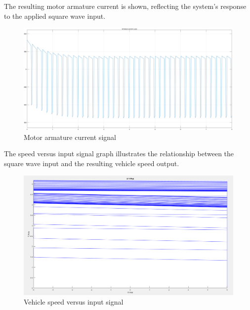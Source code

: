 \documentclass[a4paper, 12pt, english]{article}
\begin{document}
The resulting motor armature current is shown, reflecting the system’s response to the applied square wave input.
\begin{figure}[H]
    \centering
    \includegraphics[width=\linewidth]{images/armature_current.png}
    \caption{Motor armature current signal}
    \label{fig:Motor armature current signal}
\end{figure}

The speed versus input signal graph illustrates the relationship between the square wave input and the resulting vehicle speed output.
\begin{figure}[H]
    \centering
    \includegraphics[width=\linewidth]{images/speed_input.png}
    \caption{Vehicle speed versus input signal}
    \label{fig:Vehicle speed versus input signal}
\end{figure}
\end{document}
